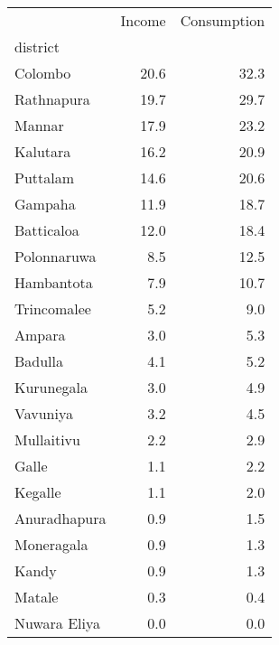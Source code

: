 \begin{tabular}{lrr}
\toprule
{} &  Income &  Consumption \\
district     &         &              \\
\midrule
Colombo      &    20.6 &         32.3 \\
Rathnapura   &    19.7 &         29.7 \\
Mannar       &    17.9 &         23.2 \\
Kalutara     &    16.2 &         20.9 \\
Puttalam     &    14.6 &         20.6 \\
Gampaha      &    11.9 &         18.7 \\
Batticaloa   &    12.0 &         18.4 \\
Polonnaruwa  &     8.5 &         12.5 \\
Hambantota   &     7.9 &         10.7 \\
Trincomalee  &     5.2 &          9.0 \\
Ampara       &     3.0 &          5.3 \\
Badulla      &     4.1 &          5.2 \\
Kurunegala   &     3.0 &          4.9 \\
Vavuniya     &     3.2 &          4.5 \\
Mullaitivu   &     2.2 &          2.9 \\
Galle        &     1.1 &          2.2 \\
Kegalle      &     1.1 &          2.0 \\
Anuradhapura &     0.9 &          1.5 \\
Moneragala   &     0.9 &          1.3 \\
Kandy        &     0.9 &          1.3 \\
Matale       &     0.3 &          0.4 \\
Nuwara Eliya &     0.0 &          0.0 \\
\bottomrule
\end{tabular}
